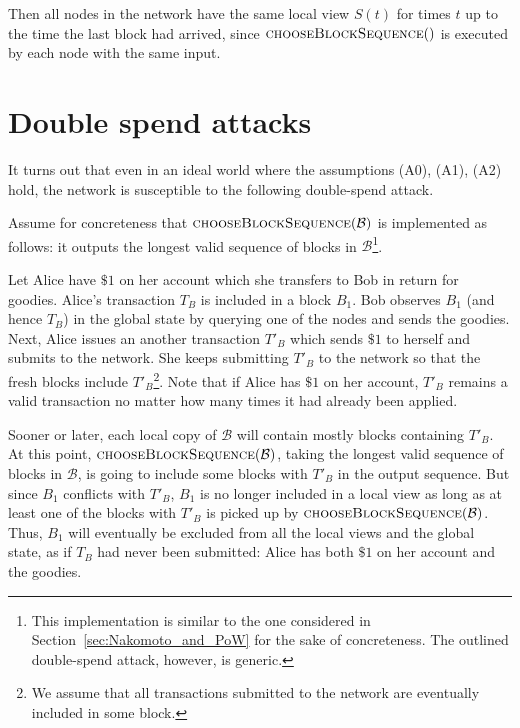 \documentclass[a4paper]{article}
\begin{document}
Then all nodes in the network have the same local view $S(t)$ for times $t$ up to the time the last block had arrived, since $\Call{chooseBlockSequence}$ is executed by each node with the same input. 

\section{Double spend attacks} \label{sec:double_spend}


   It turns out that even in an ideal world where the assumptions (A0), (A1), (A2) hold, the network is susceptible to the following double-spend attack. 

   Assume for concreteness that $\Call{chooseBlockSequence}{\mathcal{B}}$ is implemented as follows: it outputs the longest valid sequence of blocks in $\mathcal{B}$\footnote{This implementation is similar to the one considered in Section~\ref{sec:Nakomoto_and_PoW} for the sake of concreteness. The outlined double-spend attack, however, is generic.}.
   
  Let Alice have $\$1$ on her account which she transfers to Bob in return for goodies. Alice's transaction $T_B$ is included in a block $B_1$. Bob observes $B_1$ (and hence $T_B$) in the global state by querying one of the nodes and sends the goodies. Next, Alice issues an another transaction $T'_B$ which sends $\$1$ to herself and submits to the network. She keeps submitting $T'_B$ to the network so that the fresh blocks include $T'_B$\footnote{We assume that all transactions submitted to the network are eventually included in some block.}. Note that if Alice has $\$1$ on her account, $T'_B$ remains a valid transaction no matter how many times it had already been applied. 
  
Sooner or later, each local copy of $\mathcal{B}$ will contain mostly blocks containing $T'_B$. At this point, $\Call{chooseBlockSequence}{\mathcal{B}}$, taking the longest valid sequence of blocks in $\mathcal{B}$, is going to include some blocks with $T'_B$ in the output sequence. But since $B_1$ conflicts with $T'_B$, $B_1$ is no longer included in a local view as long as at least one of the blocks with $T'_B$ is picked up by $\Call{chooseBlockSequence}{\mathcal{B}}$. Thus, $B_1$ will eventually be excluded from all the local views and the global state, as if $T_B$ had never been submitted: Alice has both $\$1$ on her account and the goodies.
\end{document}
